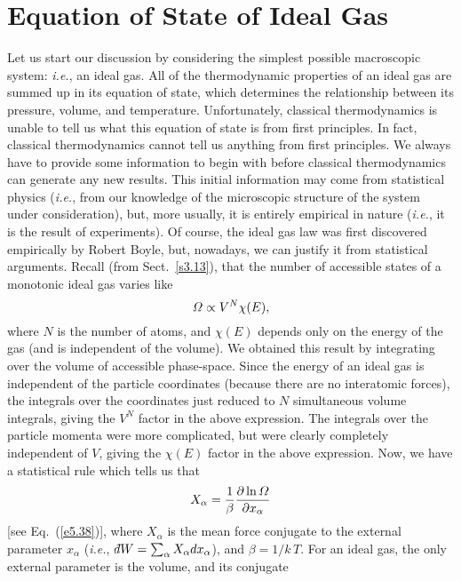 \section{Equation of State of Ideal Gas}
Let us start our discussion by considering the simplest possible macroscopic
system: {\em i.e.}, an ideal gas. All of the thermodynamic properties of an ideal gas
are summed up in its equation of state, which determines the relationship 
between its pressure, volume, and temperature. Unfortunately, classical thermodynamics is unable to tell us what this equation of state  is from first principles.
In fact,  classical thermodynamics  cannot tell us anything from
first principles. We always have to provide  some information to begin
with before classical thermodynamics  can
generate any new results.
 This initial information may come from statistical physics ({\em i.e.}, from our
knowledge of the microscopic structure of the system under
consideration), but, more usually, it is
entirely empirical in nature 
({\em i.e.}, it is the result of experiments). Of course, the ideal gas
law was first discovered empirically by Robert Boyle, but, nowadays,
we can justify it from statistical arguments. Recall
(from Sect.~\ref{s3.13}), that the number of accessible states of
a monotonic ideal gas varies like
\begin{equation}
{\mit\Omega} \propto V^N \chi(E), \label{e6.6}
\end{equation}
where $N$ is the number of atoms, and $\chi(E)$ depends only on the energy 
of the gas (and is
independent of the volume). We obtained this result  by integrating over the 
volume of accessible phase-space. Since the energy of an ideal gas is independent of 
the
particle coordinates (because there are no interatomic forces), the integrals over the
 coordinates just reduced to $N$ simultaneous volume integrals, giving the
$V^N$ factor 
in  the above expression. The integrals over the particle momenta were more
complicated, but were clearly completely independent of $V$,
giving  the $\chi(E)$ factor in the above expression.
 Now, we have a statistical rule which tells us that
\begin{equation}
X_\alpha = \frac{1}{\beta} \frac{\partial \ln {\mit\Omega}}{\partial x_\alpha}
\end{equation}
[see Eq.~(\ref{e5.38})],
where $X_\alpha$ is the mean force conjugate to the external parameter $x_\alpha$
({\em i.e.}, \,$\dbar W = \sum_\alpha X_\alpha dx_\alpha$), and $\beta = 1/k\,T$. 
For
an ideal gas,  the only external parameter is the volume, and its conjugate
